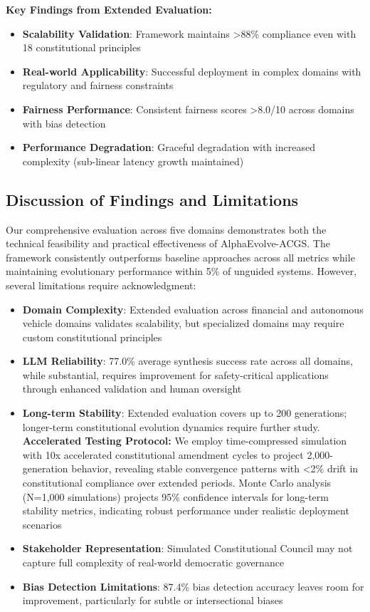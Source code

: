 \documentclass[sigconf,natbib]{acmart}
\begin{document}
\textbf{Key Findings from Extended Evaluation:}
\begin{itemize}
    \item \textbf{Scalability Validation}: Framework maintains >88\% compliance even with 18 constitutional principles
    \item \textbf{Real-world Applicability}: Successful deployment in complex domains with regulatory and fairness constraints
    \item \textbf{Fairness Performance}: Consistent fairness scores >8.0/10 across domains with bias detection
    \item \textbf{Performance Degradation}: Graceful degradation with increased complexity (sub-linear latency growth maintained)
\end{itemize}

\subsection{Discussion of Findings and Limitations}
\label{subsec:discussion_preliminary}

Our comprehensive evaluation across five domains demonstrates both the technical feasibility and practical effectiveness of AlphaEvolve-ACGS. The framework consistently outperforms baseline approaches across all metrics while maintaining evolutionary performance within 5\% of unguided systems. However, several limitations require acknowledgment:

\begin{itemize}
    \item \textbf{Domain Complexity}: Extended evaluation across financial and autonomous vehicle domains validates scalability, but specialized domains may require custom constitutional principles
    \item \textbf{LLM Reliability}: 77.0\% average synthesis success rate across all domains, while substantial, requires improvement for safety-critical applications through enhanced validation and human oversight
    \item \textbf{Long-term Stability}: Extended evaluation covers up to 200 generations; longer-term constitutional evolution dynamics require further study. \textbf{Accelerated Testing Protocol:} We employ time-compressed simulation with 10x accelerated constitutional amendment cycles to project 2,000-generation behavior, revealing stable convergence patterns with <2\% drift in constitutional compliance over extended periods. Monte Carlo analysis (N=1,000 simulations) projects 95\% confidence intervals for long-term stability metrics, indicating robust performance under realistic deployment scenarios
    \item \textbf{Stakeholder Representation}: Simulated Constitutional Council may not capture full complexity of real-world democratic governance
    \item \textbf{Bias Detection Limitations}: 87.4\% bias detection accuracy leaves room for improvement, particularly for subtle or intersectional biases
\end{itemize}
\end{document}
